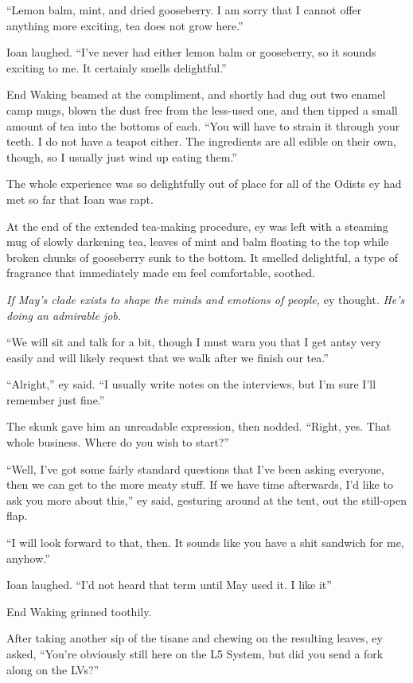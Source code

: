 ``Lemon balm, mint, and dried gooseberry. I am sorry that I cannot offer anything more exciting, tea does not grow here.''

Ioan laughed. ``I've never had either lemon balm or gooseberry, so it sounds exciting to me. It certainly smells delightful.''

End Waking beamed at the compliment, and shortly had dug out two enamel camp mugs, blown the dust free from the less-used one, and then tipped a small amount of tea into the bottoms of each. ``You will have to strain it through your teeth. I do not have a teapot either. The ingredients are all edible on their own, though, so I usually just wind up eating them.''

The whole experience was so delightfully out of place for all of the Odists ey had met so far that Ioan was rapt.

At the end of the extended tea-making procedure, ey was left with a steaming mug of slowly darkening tea, leaves of mint and balm floating to the top while broken chunks of gooseberry sunk to the bottom. It smelled delightful, a type of fragrance that immediately made em feel comfortable, soothed.

\emph{If May's clade exists to shape the minds and emotions of people,} ey thought. \emph{He's doing an admirable job.}

``We will sit and talk for a bit, though I must warn you that I get antsy very easily and will likely request that we walk after we finish our tea.''

``Alright,'' ey said. ``I usually write notes on the interviews, but I'm sure I'll remember just fine.''

The skunk gave him an unreadable expression, then nodded. ``Right, yes. That whole business. Where do you wish to start?''

``Well, I've got some fairly standard questions that I've been asking everyone, then we can get to the more meaty stuff. If we have time afterwards, I'd like to ask you more about this,'' ey said, gesturing around at the tent, out the still-open flap.

``I will look forward to that, then. It sounds like you have a shit sandwich for me, anyhow.''

Ioan laughed. ``I'd not heard that term until May used it. I like it''

End Waking grinned toothily.

After taking another sip of the tisane and chewing on the resulting leaves, ey asked, ``You're obviously still here on the L5 System, but did you send a fork along on the LVs?''

